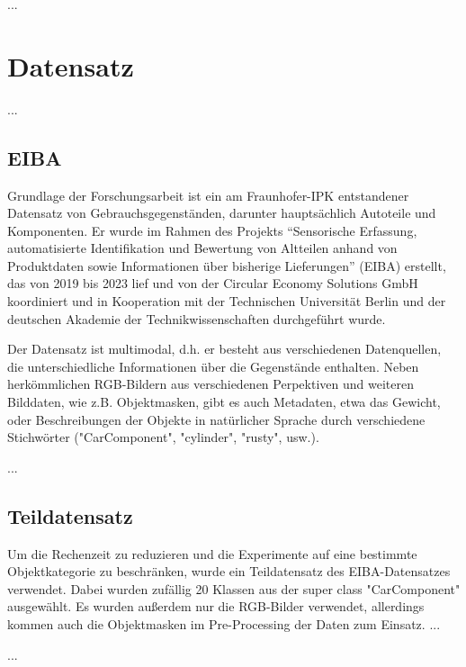 ...

\section{Datensatz}

...

\subsection{EIBA}

Grundlage der Forschungsarbeit ist ein am Fraunhofer-IPK entstandener Datensatz von Gebrauchsgegenständen, darunter hauptsächlich Autoteile und Komponenten. Er wurde im Rahmen des Projekts “Sensorische Erfassung, automatisierte Identifikation und Bewertung von Altteilen anhand von Produktdaten sowie Informationen über bisherige Lieferungen” (EIBA) erstellt, das von 2019 bis 2023 lief und von der Circular Economy Solutions GmbH koordiniert und in Kooperation mit der Technischen Universität Berlin und der deutschen Akademie der Technikwissenschaften durchgeführt wurde. \cite{}

Der Datensatz ist multimodal, d.h. er besteht aus verschiedenen Datenquellen, die unterschiedliche Informationen über die Gegenstände enthalten. Neben herkömmlichen RGB-Bildern aus verschiedenen Perpektiven und weiteren Bilddaten, wie z.B. Objektmasken, gibt es auch Metadaten, etwa das Gewicht, oder Beschreibungen der Objekte in natürlicher Sprache durch verschiedene Stichwörter ("CarComponent", "cylinder", "rusty", usw.).

...

\subsection{Teildatensatz}

Um die Rechenzeit zu reduzieren und die Experimente auf eine bestimmte Objektkategorie zu beschränken, wurde ein Teildatensatz des EIBA-Datensatzes verwendet. Dabei wurden zufällig 20 Klassen aus der super class "CarComponent" ausgewählt. Es wurden außerdem nur die RGB-Bilder verwendet, allerdings kommen auch die Objektmasken im Pre-Processing der Daten zum Einsatz. ...

...

